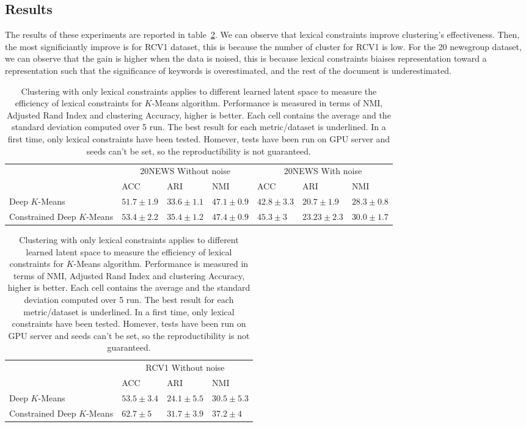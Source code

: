 \subsection{Results}
The results of these experiments are reported in table~\ref{tab:res}. We can  
observe that lexical constraints improve clustering's effectiveness. Then,
the most significiantly improve is for RCV1 dataset, this is because the number
of cluster for RCV1 is low. For the 20 newsgroup dataset, we can observe that 
the gain is higher when the data is noised, this is because lexical constraints
biaises representation toward a representation such that the significance of 
keywords is overestimated, and the rest of the document is underestimated.   

\begin{table}[!h]
\centering
  \begin{tabular}{| l | l | l | l | l | l | l | }
    \hline
    & \multicolumn{3}{|c|}{20NEWS Without noise} & \multicolumn{3}{|c|}{20NEWS With noise}  \\
    & ACC            &ARI             & NMI            & ACC           & ARI           &NMI            \\ \hline
Deep $K$-Means &$51.7\pm 1.9$&$33.6\pm 1.1$&$47.1\pm 0.9$&$42.8\pm 3.3$&$20.7\pm 1.9$&$28.3\pm 0.8$\\ \hline
Constrained Deep $K$-Means&\boldmath$53.4\pm 2.2$&\boldmath$35.4\pm 1.2$&\boldmath$47.4\pm 0.9$&\boldmath$45.3\pm 3$&\boldmath$23.23\pm 2.3$&\boldmath$30.0\pm 1.7$\\ \hline
  \end{tabular}
\begin{tabular}{| l | l | l | l | }
    \hline
     & \multicolumn{3}{|c|}{RCV1 Without noise}  \\
    &ACC            & ARI           &NMI  \\ \hline
Deep $K$-Means &$53.5\pm 3.4$&$24.1\pm 5.5$&$30.5\pm 5.3$
\\ \hline
Constrained Deep $K$-Means&\boldmath$62.7\pm 5$&\boldmath$31.7\pm 3.9$&\boldmath$37.2\pm 4$
\\ \hline
  \end{tabular}
\caption{\label{tab:res}Clustering with only lexical constraints applies to 
different learned latent space to measure the efficiency of lexical constraints
for $K$-Means algorithm. Performance is measured in terms of NMI, Adjusted Rand 
Index and clustering Accuracy, higher is better. Each cell contains the average
and the standard deviation computed over 5 run. The best result for each 
metric/dataset is underlined. In a first time, only lexical constraints have 
been tested. Homever, tests have been run on GPU server and seeds can't
be set, so the reproductibility is not guaranteed.}
\end{table}
